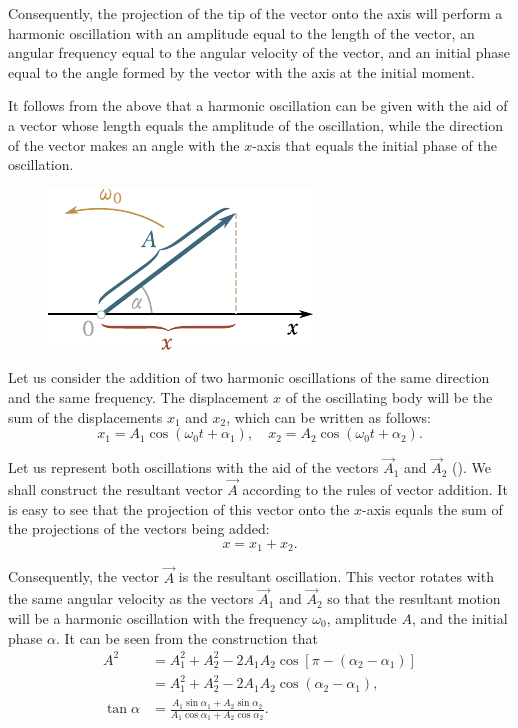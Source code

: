 \noindent
Consequently, the projection of the tip of the vector onto the axis will perform a harmonic oscillation with an amplitude equal to the length of the vector, an angular frequency equal to the angular velocity of the vector, and an initial phase equal to the angle formed by the vector with the axis at the initial moment.

It follows from the above that a harmonic oscillation can be given with the aid of a vector whose length equals the amplitude of the oscillation, while the direction of the vector makes an angle with the $x$-axis that equals the initial phase of the oscillation.

\begin{figure}[t]
	\begin{center}
		\includegraphics[scale=0.95]{figures/ch_07/fig_7_9.pdf}
		\caption[]{}
		\label{fig:7_9}
	\end{center}
	\vspace{-0.8cm}
\end{figure}

Let us consider the addition of two harmonic oscillations of the same direction and the same frequency. The displacement $x$ of the oscillating body will be the sum of the displacements $x_1$ and $x_2$, which can be written as follows:
\begin{equation}\label{eq:7_83}
	x_1 = A_1\cos(\omega_0 t + \alpha_1),\quad x_2 = A_2\cos(\omega_0 t + \alpha_2).
\end{equation}

\noindent
Let us represent both oscillations with the aid of the vectors $\vec{A}_1$ and $\vec{A}_2$ (). We shall construct the resultant vector $\vec{A}$ according to the rules of vector addition. It is easy to see that the projection of this vector onto the $x$-axis equals the sum of the projections of the vectors being added:
\begin{equation*}
	x = x_1 + x_2.
\end{equation*}

\noindent
Consequently, the vector $\vec{A}$ is the resultant oscillation. This vector rotates with the same angular velocity as the vectors $\vec{A}_1$ and $\vec{A}_2$ so that the resultant motion will be a harmonic oscillation with the frequency $\omega_0$, amplitude $A$, and the initial phase $\alpha$. It can be seen from the construction that
\begin{align}
	A^2 &= A_1^2 + A_2^2 - 2A_1A_2\cos[\pi-(\alpha_2-\alpha_1)] \nonumber\\
	&= A_1^2 + A_2^2 - 2A_1A_2\cos(\alpha_2-\alpha_1), \label{eq:7_84}\\
	\tan\alpha &= \frac{A_1\sin\alpha_1 + A_2\sin\alpha_2}{A_1\cos\alpha_1 + A_2\cos\alpha_2}.\label{eq:7_85}
\end{align}

